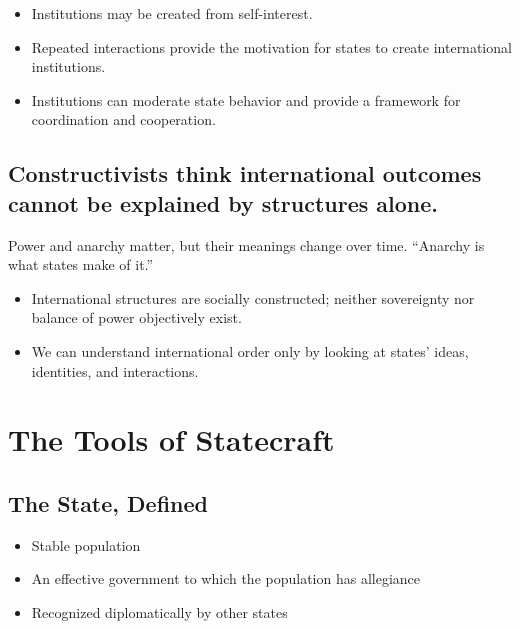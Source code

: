 \documentclass[
]{book}
\begin{document}
\begin{itemize}
\item
  Institutions may be created from self-interest.
\item
  Repeated interactions provide the motivation for states to create international institutions.
\item
  Institutions can moderate state behavior and provide a framework for coordination and cooperation.
\end{itemize}

\hypertarget{constructivists-think-international-outcomes-cannot-be-explained-by-structures-alone.}{%
\section{Constructivists think international outcomes cannot be explained by structures alone.}\label{constructivists-think-international-outcomes-cannot-be-explained-by-structures-alone.}}

Power and anarchy matter, but their meanings change over time. ``Anarchy is what states make of it.''

\begin{itemize}
\item
  International structures are socially constructed; neither sovereignty nor balance of power objectively exist.
\item
  We can understand international order only by looking at states' ideas, identities, and interactions.
\end{itemize}

\hypertarget{the-tools-of-statecraft}{%
\chapter{The Tools of Statecraft}\label{the-tools-of-statecraft}}

\hypertarget{the-state-defined}{%
\section{The State, Defined}\label{the-state-defined}}

\begin{itemize}
\item
  Stable population
\item
  An effective government to which the population has allegiance
\item
  Recognized diplomatically by other states
\end{itemize}
\end{document}
